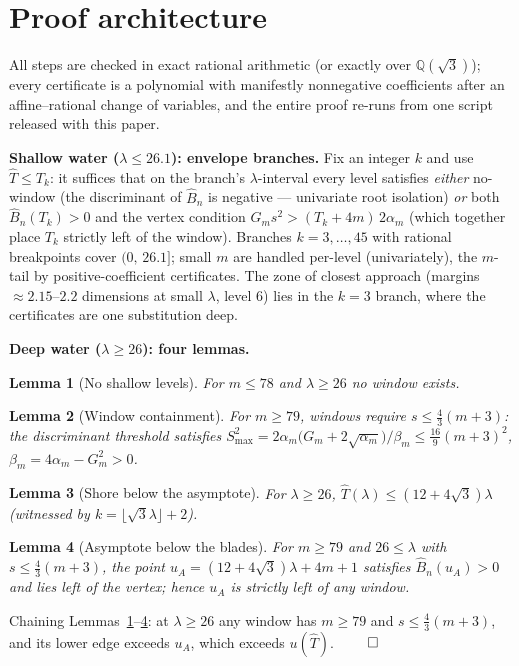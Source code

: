 \documentclass[11pt]{article}
\newtheorem{lemma}{Lemma}
\begin{document}
\section{Proof architecture}
All steps are checked in exact rational arithmetic (or exactly over
$\mathbb{Q}(\sqrt3)$); every certificate is a polynomial with manifestly
nonnegative coefficients after an affine--rational change of variables, and
the entire proof re-runs from one script released with this paper.

\textbf{Shallow water ($\lambda\le26.1$): envelope branches.} Fix an integer
$k$ and use $\widehat T\le T_k$: it suffices that on the branch's
$\lambda$-interval every level satisfies \emph{either} no-window
(the discriminant of $\widehat B_n$ is negative --- univariate root
isolation) \emph{or} both $\widehat B_n(T_k)>0$ and the vertex condition
$G_ms^2>(T_k+4m)\,2\alpha_m$ (which together place $T_k$ strictly left of
the window). Branches $k=3,\dots,45$ with rational breakpoints cover
$(0,\,26.1]$; small $m$ are handled per-level (univariately), the $m$-tail
by positive-coefficient certificates. The zone of closest approach (margins
$\approx2.15$--$2.2$ dimensions at small $\lambda$, level $6$) lies in the $k{=}3$ branch,
where the certificates are one substitution deep.

\textbf{Deep water ($\lambda\ge26$): four lemmas.}
\begin{lemma}[No shallow levels]\label{lem:T0}
For $m\le78$ and $\lambda\ge26$ no window exists.
\end{lemma}
\begin{lemma}[Window containment]\label{lem:L2}
For $m\ge79$, windows require $s\le\tfrac43(m+3)$: the discriminant
threshold satisfies
$S^2_{\max}=2\alpha_m\bigl(G_m+2\sqrt{\alpha_m}\bigr)/\beta_m
\le\tfrac{16}{9}(m+3)^2$, $\beta_m=4\alpha_m-G_m^2>0$.
\end{lemma}
\begin{lemma}[Shore below the asymptote]\label{lem:L1}
For $\lambda\ge26$, $\widehat T(\lambda)\le(12+4\sqrt3)\lambda$
(witnessed by $k=\lfloor\sqrt3\lambda\rfloor+2$).
\end{lemma}
\begin{lemma}[Asymptote below the blades]\label{lem:L3}
For $m\ge79$ and $26\le\lambda$ with $s\le\tfrac43(m+3)$, the point
$u_A=(12+4\sqrt3)\lambda+4m+1$ satisfies $\widehat B_n(u_A)>0$ and lies
left of the vertex; hence $u_A$ is strictly left of any window.
\end{lemma}
Chaining Lemmas~\ref{lem:T0}--\ref{lem:L3}: at $\lambda\ge26$ any window
has $m\ge79$ and $s\le\tfrac43(m+3)$, and its lower edge exceeds $u_A$,
which exceeds $u(\widehat T)$. $\qed$
\end{document}
